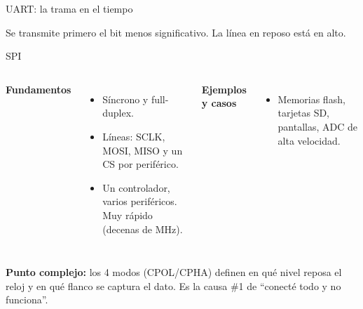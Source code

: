 \documentclass[aspectratio=169,11pt]{beamer}
\newcommand{\complejo}[1]{{\color{cobre}\textbf{Punto complejo:}} #1}
\begin{document}
\begin{frame}{UART: la trama en el tiempo}
\begin{center}
\end{center}
\vspace{0.3em}
{\footnotesize Se transmite primero el bit menos significativo. La línea en reposo está en alto.}
\end{frame}

\begin{frame}{SPI}
\begin{columns}[T]
\textbf{Fundamentos}
\begin{itemize}\small
  \item Síncrono y full-duplex.
  \item Líneas: SCLK, MOSI, MISO y un CS por periférico.
  \item Un controlador, varios periféricos. Muy rápido (decenas de MHz).
\end{itemize}
\textbf{Ejemplos y casos}
\begin{itemize}\small
  \item Memorias flash, tarjetas SD, pantallas, ADC de alta velocidad.
\end{itemize}
\end{columns}
\vspace{0.4em}
\complejo{los \alert{4 modos (CPOL/CPHA)} definen en qué nivel reposa el reloj y en qué flanco se captura el dato. Es la causa \#1 de ``conecté todo y no funciona''.}
\end{frame}
\end{document}
